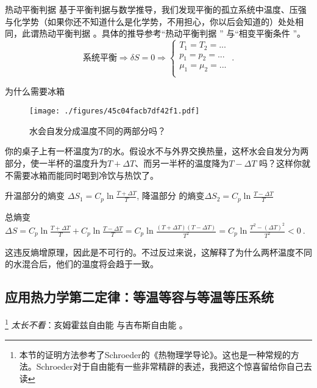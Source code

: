 \begin{theorem}{热动平衡判据}
基于平衡判据与数学推导，我们发现平衡的孤立系统中温度、压强与化学势（如果你还不知道什么是化学势，不用担心，你以后会知道的）处处相同，此谓热动平衡判据  。具体的推导参考“热动平衡判据  ” 与“相变平衡条件  ”。
$$
\text{系统平衡} \Rightarrow \delta S = 0 \Rightarrow 
\left \{
\begin{aligned}
T_1 = T_2 = ...\\
p_1 = p_2 = ...\\
\mu_1 = \mu_2 = ...\\
\end{aligned}
\right.
~.
$$

\end{theorem}

\begin{example}{为什么需要冰箱}
\begin{figure}[ht]
\centering
\texttt{[image: ./figures/45c04facb7df42f1.pdf]}
\caption{水会自发分成温度不同的两部分吗？} \label{fig_Td2Law_5}
\end{figure}
你的桌子上有一杯温度为$T$的水。假设水不与外界交换热量，这杯水会自发分为两部分，使一半杯的温度升为$T+\Delta T$、而另一半杯的温度降为$T-\Delta T$ 吗？这样你就不需要冰箱而能同时喝到冷饮与热饮了。

升温部分的熵变 $\Delta S_1=C_p \ln \frac{T+\Delta T}{T}$, 降温部分 的熵变$\Delta S_2=C_p \ln \frac{T-\Delta T}{T}$

总熵变 $\Delta S = C_p \ln \frac{T+\Delta T}{T} + C_p \ln \frac{T-\Delta T}{T} = C_p \ln \frac{(T+\Delta T)(T-\Delta T)}{T^2}= C_p \ln \frac{T^2 - (\Delta T)^2}{T^2}<0~.$

这违反熵增原理，因此是不可行的。不过反过来说，这解释了为什么两杯温度不同的水混合后，他们的温度将会趋于一致。

\end{example}

\subsection{应用热力学第二定律：等温等容与等温等压系统}
\footnote{本节的证明方法参考了Schroeder的《热物理学导论》。这也是一种常规的方法。Schroeder对于自由能有一些非常精辟的表述，我把这个惊喜留给你自己去读} 
\textsl{太长不看}：亥姆霍兹自由能 与吉布斯自由能 。


